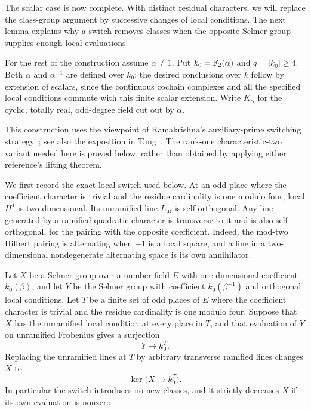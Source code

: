 The scalar case is now complete.  With distinct residual characters,
we will replace the class-group argument by successive changes of local
conditions.  The next lemma explains why a switch removes classes when
the opposite Selmer group supplies enough local evaluations.

For the rest of the construction assume $\alpha\ne1$.  Put
$k_0=\mathbb F_2(\alpha)$ and $q=|k_0|\ge4$.  Both $\alpha$ and
$\alpha^{-1}$ are defined over $k_0$; the desired conclusions over
$k$ follow by extension of scalars, since the continuous cochain
complexes and all the specified local conditions commute with this
finite scalar extension.  Write $K_\alpha$ for the cyclic,
totally real, odd-degree field cut out by $\alpha$.

This construction uses the viewpoint of Ramakrishna's auxiliary-prime
switching strategy~\cite{Ramakrishna2002}; see also the exposition in
Tang~\cite[Section~3A2, proof of Theorem~3.4]{Tang2019}.
The rank-one characteristic-two variant needed here is proved below,
rather than obtained by applying either reference's lifting theorem.

We first record the exact local switch used below.  At an odd place
where the coefficient character is trivial and the residue cardinality
is one modulo four, local $H^1$ is two-dimensional.  Its unramified
line $L_{\mathrm{ur}}$ is self-orthogonal.  Any line generated by a
ramified quadratic character is transverse to it and is also
self-orthogonal, for the pairing with the opposite coefficient.
Indeed, the mod-two Hilbert pairing is alternating when $-1$ is a
local square, and a line in a two-dimensional nondegenerate alternating
space is its own annihilator.

\begin{lemma}\label{lem:selmer-switch}
Let $X$ be a Selmer group over a number field $E$ with one-dimensional
coefficient $k_0(\beta)$, and let $Y$ be the Selmer group with coefficient
$k_0(\beta^{-1})$ and orthogonal local conditions.  Let $T$ be a finite
set of odd places of $E$ where the coefficient character is trivial
and the residue cardinality is one modulo four.  Suppose that $X$ has
the unramified local condition at every place in $T$, and that evaluation
of $Y$ on unramified Frobenius gives a surjection
\[
                 Y\longrightarrow k_0^T.
\]
Replacing the unramified lines at $T$ by arbitrary transverse ramified
lines changes $X$ to
\[
       \ker\bigl(X\longrightarrow k_0^T\bigr).
\]
In particular the switch introduces no new classes, and it strictly
decreases $X$ if its own evaluation is nonzero.
\end{lemma}

